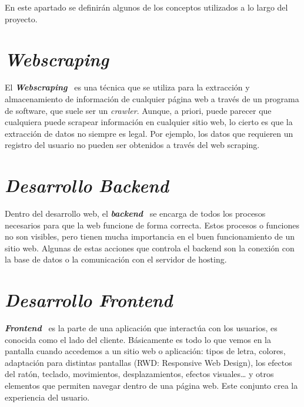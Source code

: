 
En este apartado se definirán algunos de los conceptos utilizados a lo largo del proyecto.

\section{\textit{Webscraping}}
El \textbf{\textit{Webscraping}}~\cite{webScrap} es una técnica que se utiliza para la extracción y almacenamiento de información de cualquier página web a través de un programa de software, que suele ser un \textit{crawler}. Aunque, a priori, puede parecer que cualquiera puede scrapear información en cualquier sitio web, lo cierto es que la extracción de datos no siempre es legal. Por ejemplo, los datos que requieren un registro del usuario no pueden ser obtenidos a través del web scraping.

\section{\textit{Desarrollo Backend}}
Dentro del desarrollo web, el \textbf{\textit{backend}}~\cite{backend} se encarga de todos los procesos necesarios para que la web funcione de forma correcta. Estos procesos o funciones no son visibles, pero tienen mucha importancia en el buen funcionamiento de un sitio web. Algunas de estas acciones que controla el backend son la conexión con la base de datos o la comunicación con el servidor de hosting.

\section{\textit{Desarrollo Frontend}}
\textbf{\textit{Frontend}}~\cite{Frontend} es la parte de una aplicación que interactúa con los usuarios, es conocida como el lado del cliente. Básicamente es todo lo que vemos en la pantalla cuando accedemos a un sitio web o aplicación: tipos de letra, colores, adaptación para distintas pantallas (RWD: Responsive Web Design), los efectos del ratón, teclado, movimientos, desplazamientos, efectos visuales… y otros elementos que permiten navegar dentro de una página web. Este conjunto crea la experiencia del usuario.

